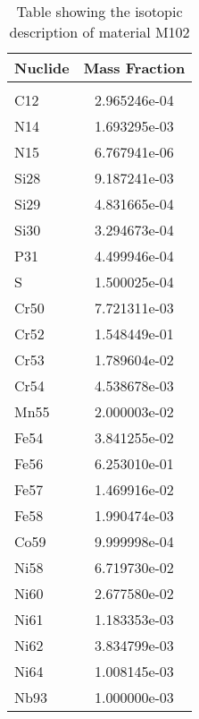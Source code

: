 \begin{centering}
\begin{table}[ht!]
\begin{tabular}{l | c}
\hline
Nuclide & Mass Fraction\\
\hline
\\
C12 & 2.965246e-04\\
N14 & 1.693295e-03\\
N15 & 6.767941e-06\\
Si28 & 9.187241e-03\\
Si29 & 4.831665e-04\\
Si30 & 3.294673e-04\\
P31 & 4.499946e-04\\
S & 1.500025e-04\\
Cr50 & 7.721311e-03\\
Cr52 & 1.548449e-01\\
Cr53 & 1.789604e-02\\
Cr54 & 4.538678e-03\\
Mn55 & 2.000003e-02\\
Fe54 & 3.841255e-02\\
Fe56 & 6.253010e-01\\
Fe57 & 1.469916e-02\\
Fe58 & 1.990474e-03\\
Co59 & 9.999998e-04\\
Ni58 & 6.719730e-02\\
Ni60 & 2.677580e-02\\
Ni61 & 1.183353e-03\\
Ni62 & 3.834799e-03\\
Ni64 & 1.008145e-03\\
Nb93 & 1.000000e-03
\end{tabular}
\caption{Table showing the isotopic description of material M102}
\label{table:material_M102}
\end{table}\clearpage


\end{centering}
